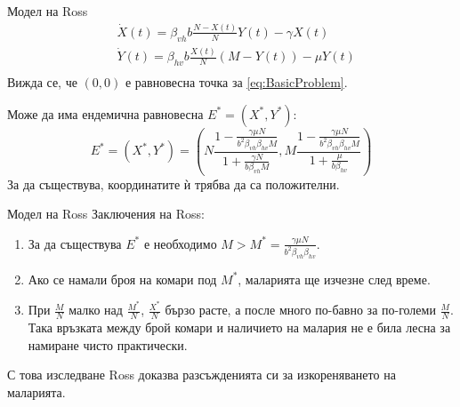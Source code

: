 \begin{frame}[t]{Модел на Ross}
  \begin{equation}
    \label{eq:BasicProblem}
    \begin{split}
      &\dot{X}(t) = \beta_{vh} b \frac{N-X(t)}{N} Y(t) - \gamma X(t) \\
      &\dot{Y}(t) = \beta_{hv} b \frac{X(t)}{N} (M-Y(t)) - \mu Y(t) \\
    \end{split}
  \end{equation}
  Вижда се, че $(0, 0)$ е равновесна точка за \eqref{eq:BasicProblem}.

  Може да има ендемична равновесна $E^* = (X^*, Y^*)$:
  \begin{equation*}
    E^* = (X^*, Y^*) = \left(N \frac{1 - \frac{\gamma \mu N}{b^2 \beta_{vh} \beta_{hv} M}}{1 + \frac{\gamma N}{b \beta_{vh} M}}, M \frac{1 - \frac{\gamma \mu N}{b^2 \beta_{vh} \beta_{hv} M}}{1 + \frac{\mu}{b \beta_{hv}}}\right)
  \end{equation*}
  За да съществува, координатите ѝ трябва да са положителни.
\end{frame}

\begin{frame}[t]{Модел на Ross}
  Заключения на Ross:
  \begin{enumerate}
    \item За да съществува $E^*$ е необходимо $M > M^* = \frac{\gamma \mu N}{b^2 \beta_{vh} \beta_{hv}}$.
    \item Ако се намали броя на комари под $M^*$, маларията ще изчезне след време.
    \item При $\frac{M}{N}$ малко над $\frac{M^*}{N}$, $\frac{X^*}{N}$ бързо расте, а после много по-бавно за по-големи $\frac{M}{N}$. Така връзката между брой комари и наличието на малария не е била лесна за намиране чисто практически.
  \end{enumerate}

  С това изследване Ross доказва разсъжденията си за изкореняването на маларията.
\end{frame}
